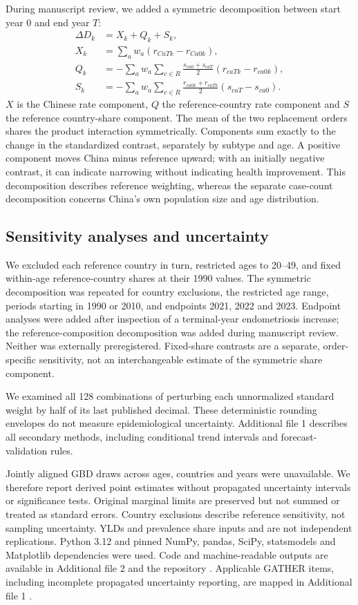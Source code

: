 \documentclass[11pt,a4paper]{article}
\begin{document}
During manuscript review, we added a symmetric decomposition between start year 0 and end year $T$:
\begin{align}
 \Delta D_k &= X_k+Q_k+S_k,\\
 X_k &=\sum_a w_a(r_{CaTk}-r_{Ca0k}),\\
 Q_k &=-\sum_a w_a\sum_{c\in R}\frac{s_{ca0}+s_{caT}}{2}(r_{caTk}-r_{ca0k}),\\
 S_k &=-\sum_a w_a\sum_{c\in R}\frac{r_{ca0k}+r_{caTk}}{2}(s_{caT}-s_{ca0}).
\end{align}
$X$ is the Chinese rate component, $Q$ the reference-country rate component and $S$ the reference country-share component. The mean of the two replacement orders shares the product interaction symmetrically. Components sum exactly to the change in the standardized contrast, separately by subtype and age. A positive component moves China minus reference upward; with an initially negative contrast, it can indicate narrowing without indicating health improvement. This decomposition describes reference weighting, whereas the separate case-count decomposition concerns China's own population size and age distribution.

\subsection{Sensitivity analyses and uncertainty}
We excluded each reference country in turn, restricted ages to 20--49, and fixed within-age reference-country shares at their 1990 values. The symmetric decomposition was repeated for country exclusions, the restricted age range, periods starting in 1990 or 2010, and endpoints 2021, 2022 and 2023. Endpoint analyses were added after inspection of a terminal-year endometriosis increase; the reference-composition decomposition was added during manuscript review. Neither was externally preregistered. Fixed-share contrasts are a separate, order-specific sensitivity, not an interchangeable estimate of the symmetric share component.

We examined all 128 combinations of perturbing each unnormalized standard weight by half of its last published decimal. These deterministic rounding envelopes do not measure epidemiological uncertainty. Additional file 1 describes all secondary methods, including conditional trend intervals and forecast-validation rules.

Jointly aligned GBD draws across ages, countries and years were unavailable. We therefore report derived point estimates without propagated uncertainty intervals or significance tests. Original marginal limits are preserved but not summed or treated as standard errors. Country exclusions describe reference sensitivity, not sampling uncertainty. YLDs and prevalence share inputs and are not independent replications. Python 3.12 and pinned NumPy, pandas, SciPy, statsmodels and Matplotlib dependencies were used. Code and machine-readable outputs are available in Additional file 2 and the repository \cite{repository}. Applicable GATHER items, including incomplete propagated uncertainty reporting, are mapped in Additional file 1 \cite{gather}.
\end{document}
